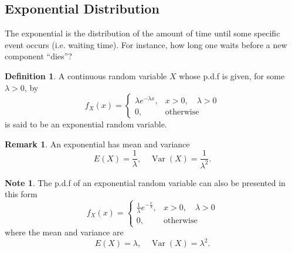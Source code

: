 \documentclass[12pt,a4paper]{report}
\theoremstyle{definition}
\newtheorem{definition}[thm]{Definition}
\newtheorem{note}[thm]{Note}
\newtheorem{remark}[thm]{Remark}
\theoremstyle{plain}
\theoremstyle{definition}
\begin{document}
\subsection{Exponential Distribution}
\vspace{-15pt}
The exponential is the distribution of the amount of time until some specific event occurs (i.e. waiting time). For instance, how long one waits before a new component ``dies''?



\begin{definition}
A continuous random variable $X$ whose p.d.f is given, for some $\lambda > 0$, by 
\[ f_X(x)=
\begin{cases}
\lambda e^{-\lambda x}, & x >0,\quad \lambda>0\\
0, &\text{otherwise}
\end{cases}
\]
is said to be an exponential random variable.
\end{definition}



\begin{remark}
An exponential has mean and variance 
\[E(X)=\frac{1}{\lambda},\quad \operatorname{Var}(X)=\frac{1}{\lambda^2}.\]
\end{remark}

\begin{note}
The p.d.f of an exponential random variable can also be presented in this form
\[ f_X(x)=
\begin{cases}
\frac{1}{\lambda}e^{-\frac{x}{\lambda}}, & x>0,\quad \lambda>0\\
0, &\text{otherwise}
\end{cases}
\]
where the mean and variance are
\[E(X)=\lambda, \quad \operatorname{Var}(X)=\lambda^2.\]
\end{note}
\end{document}
